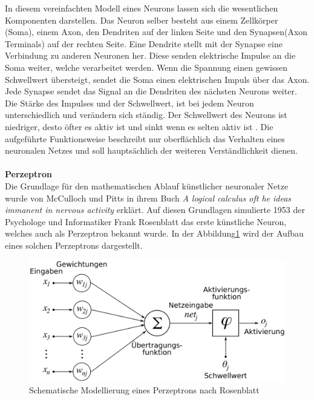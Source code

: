 \documentclass[a4paper,12pt,oneside]{article}
\begin{document}
In diesem vereinfachten Modell eines Neurons lassen sich die wesentlichen Komponenten darstellen. Das Neuron selber besteht aus einem Zellkörper (Soma), einem Axon, den Dendriten auf der linken Seite und den Synapsen(Axon Terminals) auf der rechten Seite. Eine Dendrite stellt mit der Synapse eine Verbindung zu anderen Neuronen her. Diese senden elektrische Impulse an die Soma weiter, welche verarbeitet werden. Wenn die Spannung einen gewissen Schwellwert übersteigt, sendet die Soma einen elektrischen Impuls über das Axon. Jede Synapse sendet das Signal an die Dendriten des nächsten Neurons weiter. Die Stärke des Impulses und der Schwellwert, ist bei jedem Neuron unterschiedlich und verändern sich ständig. Der Schwellwert des Neurons ist niedriger, desto öfter es aktiv ist und sinkt wenn es selten aktiv ist \cite{schmidt2013physiologie}. Die aufgeführte Funktionsweise beschreibt nur oberflächlich das Verhalten eines neuronalen Netzes und soll hauptsächlich der weiteren Verständlichkeit dienen.\\\\
\textbf{Perzeptron}\\
Die Grundlage für den mathematischen Ablauf künstlicher neuronaler Netze wurde von McCulloch und Pitts in ihrem Buch \textit{A logical calculus oft he ideas immanent in nervous activity} erklärt. Auf diesen Grundlagen simulierte 1953 der Psychologe und Informatiker Frank Rosenblatt das erste künstliche Neuron, welches auch als Perzeptron bekannt wurde. In der Abbildung\ref{img:Perzeptron} wird der Aufbau eines solchen Perzeptrons dargestellt.\\
\begin{figure}
	[h]
	\centering
	\includegraphics[scale=0.3]{Sources/perzeptron2.png}
	\caption{Schematische Modellierung eines Perzeptrons nach Rosenblatt \cite{perzeptron2019}}
	\label{img:Perzeptron}
\end{figure}\\
\end{document}

